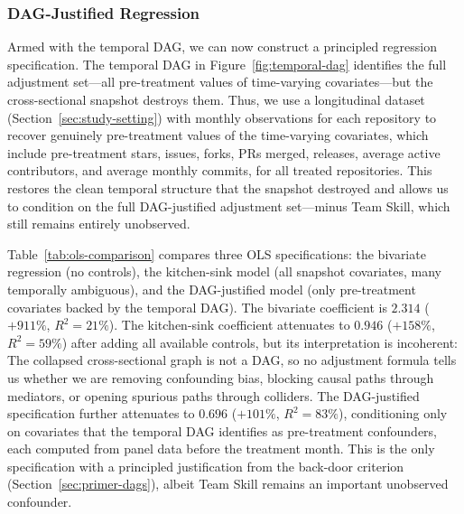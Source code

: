 \subsubsection{DAG-Justified Regression}
\label{sec:dag-justified}

Armed with the temporal DAG, we can now construct a principled regression specification.
The temporal DAG in Figure~\ref{fig:temporal-dag} identifies the full adjustment set---all pre-treatment values of time-varying covariates---but the cross-sectional snapshot destroys them.
Thus, we use a longitudinal dataset (Section~\ref{sec:study-setting}) with monthly observations for each repository to recover genuinely pre-treatment values of the time-varying covariates, which include pre-treatment stars, issues, forks, PRs merged, releases, average active contributors, and average monthly commits, for all treated repositories.
This restores the clean temporal structure that the snapshot destroyed and allows us to condition on the full DAG-justified adjustment set---minus Team Skill, which still remains entirely unobserved.

Table~\ref{tab:ols-comparison} compares three OLS specifications: the bivariate regression (no controls), the kitchen-sink model (all snapshot covariates, many temporally ambiguous), and the DAG-justified model (only pre-treatment covariates backed by the temporal DAG).
The bivariate coefficient is $2.314$ ($+911\%$, $R^2 = 21\%$).
The kitchen-sink coefficient attenuates to $0.946$ ($+158\%$, $R^2 = 59\%$) after adding all available controls, but its interpretation is incoherent: The collapsed cross-sectional graph is not a DAG, so no adjustment formula tells us whether we are removing confounding bias, blocking causal paths through mediators, or opening spurious paths through colliders.
The DAG-justified specification further attenuates to $0.696$ ($+101\%$, $R^2 = 83\%$), conditioning only on covariates that the temporal DAG identifies as pre-treatment confounders, each computed from panel data before the treatment month.
This is the only specification with a principled justification from the back-door criterion (Section~\ref{sec:primer-dags}), albeit Team Skill remains an important unobserved confounder.

